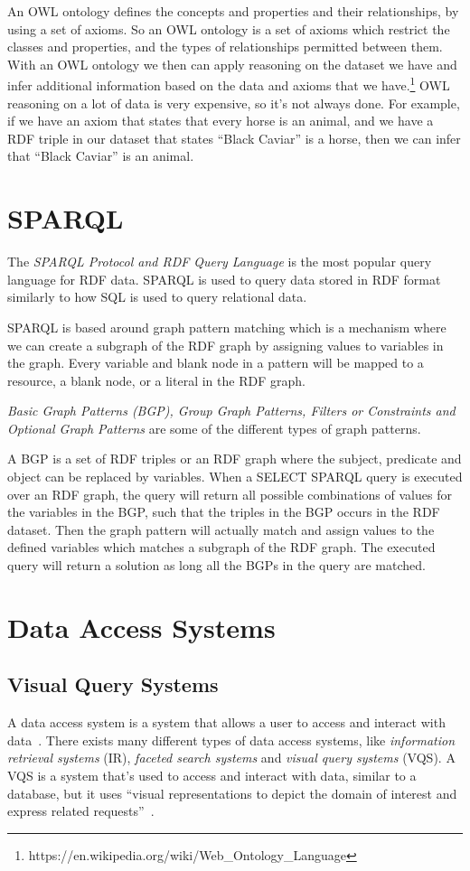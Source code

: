 \documentclass[a4paper,english]{ifimaster/ifimaster}
\begin{document}
An OWL ontology defines the concepts and properties and their relationships, by using a set of axioms. So an OWL ontology is a set of axioms which restrict the classes and properties, and the types of relationships permitted between them.
With an OWL ontology we then can apply reasoning on the dataset we have and infer additional information based on the data and axioms that we have.\footnote{https://en.wikipedia.org/wiki/Web\_Ontology\_Language} 
OWL reasoning on a lot of data is very expensive, so it's not always done. 
For example, if we have an axiom that states that every horse is an animal, and we have a RDF triple in our dataset that states “Black Caviar” is a horse, then we can infer that ``Black Caviar'' is an animal. 


\section{SPARQL}
The \textit{SPARQL Protocol and RDF Query Language} is the most popular query language for RDF data. SPARQL is used to query data stored in RDF format similarly to how SQL is used to query relational data.~\cite{SPARQL_W3C} 

SPARQL is based around graph pattern matching which is a mechanism where we can create a subgraph of the RDF graph by assigning values to variables in the graph. Every variable and blank node in a pattern will be mapped to a resource, a blank node, or a literal in the RDF graph.

\textit{Basic Graph Patterns (BGP), Group Graph Patterns, Filters or Constraints and Optional Graph Patterns} are some of the different types of graph patterns. 

A BGP is a set of RDF triples or an RDF graph where the subject, predicate and object can be replaced by variables. When a SELECT SPARQL query is executed over an RDF graph, the query will return all possible combinations of values for the variables in the BGP, such that the triples in the BGP occurs in the RDF dataset. Then the graph pattern will actually match and assign values to the defined variables which matches a subgraph of the RDF graph. The executed query will return a solution as long all the BGPs in the query are matched.

\section{Data Access Systems}
\subsection{Visual Query Systems} \label{Visual Query Systems}
A data access system is a system that allows a user to access and interact with data~\cite{vidar-phd-2020}. There exists many different types of data access systems, like \textit{information retrieval systems} (IR), \textit{faceted search systems} and \textit{visual query systems} (VQS). A VQS is a system that's used to access and interact with data, similar to a database, but it uses ``visual representations to depict the domain of interest and express related requests''~\cite{VQS_for_databases}. 
\end{document}
